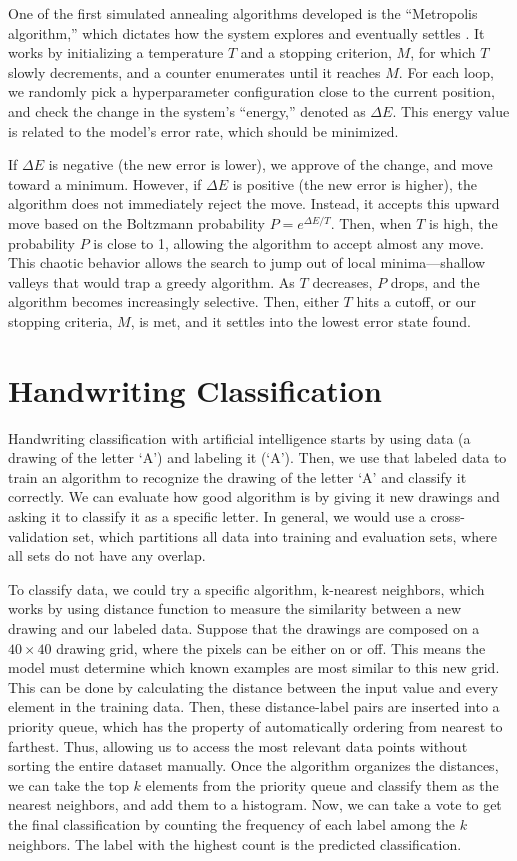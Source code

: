 \documentclass[stu,12pt,floatsintext]{apa7}
\begin{document}
One of the first simulated annealing algorithms developed is the ``Metropolis algorithm,'' which dictates how the system explores and eventually settles \parencite{rutenbar2002simulated}. It works by initializing a temperature \(T\) and a stopping criterion, \(M\), for which \(T\) slowly decrements, and a counter enumerates until it reaches \(M\). For each loop, we randomly pick a hyperparameter configuration close to the current position, and check the change in the system's ``energy,'' denoted as \(\Delta E\). This energy value is related to the model's error rate, which should be minimized.

If \(\Delta E\) is negative (the new error is lower), we approve of the change, and move toward a minimum. However, if \(\Delta E\) is positive (the new error is higher), the algorithm does not immediately reject the move. Instead, it accepts this upward move based on the Boltzmann probability \(P = e^{\Delta E/T}\). Then, when \(T\) is high, the probability \(P\) is close to 1, allowing the algorithm to accept almost any move. This chaotic behavior allows the search to jump out of local minima—shallow valleys that would trap a greedy algorithm. As \(T\) decreases, \(P\) drops, and the algorithm becomes increasingly selective. Then, either \(T\) hits a cutoff, or our stopping criteria, \(M\), is met, and it settles into the lowest error state found.


\section{Handwriting Classification}

Handwriting classification with artificial intelligence starts by using data (a drawing of the letter `A') and labeling it (`A'). Then, we use that labeled data to train an algorithm to recognize the drawing of the letter `A' and classify it correctly. We can evaluate how good algorithm is by giving it new drawings and asking it to classify it as a specific letter. In general, we would use a cross-validation set, which partitions all data into training and evaluation sets, where all sets do not have any overlap.

To classify data, we could try a specific algorithm, k-nearest neighbors, which works by using distance function to measure the similarity between a new drawing and our labeled data. Suppose that the drawings are composed on a \(40 \times 40\) drawing grid, where the pixels can be either on or off. This means the model must determine which known examples are most similar to this new grid. This can be done by calculating the distance between the input value and every element in the training data. Then, these distance-label pairs are inserted into a priority queue, which has the property of automatically ordering from nearest to farthest. Thus, allowing us to access the most relevant data points without sorting the entire dataset manually. Once the algorithm organizes the distances, we can take the top \(k\) elements from the priority queue and classify them as the nearest neighbors, and add them to a histogram. Now, we can take a vote to get the final classification by counting the frequency of each label among the \(k\) neighbors. The label with the highest count is the predicted classification. 
\end{document}
